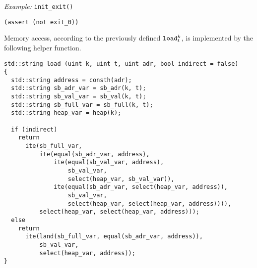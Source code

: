 \noindent
\emph{Example:} \lstinline[style=c++]{init_exit()}

\begin{lstlisting}[language=SMTLib]
(assert (not exit_0))
\end{lstlisting}



\noindent
Memory access, according to the previously defined $\texttt{load}^k_t$, is implemented by the following helper function.

\begin{lstlisting}[style=c++]
std::string load (uint k, uint t, uint adr, bool indirect = false)
{
  std::string address = consth(adr);
  std::string sb_adr_var = sb_adr(k, t);
  std::string sb_val_var = sb_val(k, t);
  std::string sb_full_var = sb_full(k, t);
  std::string heap_var = heap(k);

  if (indirect)
    return
      ite(sb_full_var,
          ite(equal(sb_adr_var, address),
              ite(equal(sb_val_var, address),
                  sb_val_var,
                  select(heap_var, sb_val_var)),
              ite(equal(sb_adr_var, select(heap_var, address)),
                  sb_val_var,
                  select(heap_var, select(heap_var, address)))),
          select(heap_var, select(heap_var, address)));
  else
    return
      ite(land(sb_full_var, equal(sb_adr_var, address)),
          sb_val_var,
          select(heap_var, address));
}
\end{lstlisting}


